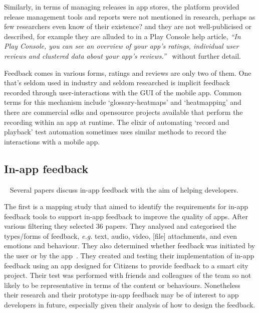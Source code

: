 Similarly, in terms of managing releases in app stores, the platform provided release management tools and reports were not mentioned in research, perhaps as few researchers even know of their existence? and they are not well-publicised or described, for example they are alluded to in a Play Console help article, \emph{``In Play Console, you can see an overview of your app's ratings, individual user reviews and clustered data about your app's reviews.''}~ without further detail.

Feedback comes in various forms, ratings and reviews are only two of them.  One that's seldom used in industry and seldom researched is implicit feedback recorded through user-interactions with the GUI of the mobile app. Common terms for this mechanism include `\glspl{glossary-heatmap}' and `heatmapping' and there are commercial \Glspl{sdk} and opensource projects available that perform the recording within an app at runtime. The elixir of automating `record and playback' test automation sometimes uses similar methods to record the interactions with a mobile app. 

\subsection{In-app feedback}~\label{rw-in-app-feedback-topic}
Several papers discuss in-app feedback with the aim of helping developers. 

The first is a mapping study that aimed to identify the requirements for in-app feedback tools to support in-app feedback to improve the quality of apps. After various filtering they selected 36 papers. They analysed and categorised the types/forms of feedback, \emph{e.g.} text, audio, video, [file] attachments, and even emotions and behaviour. They also determined whether feedback was initiated by the user or by the app~. 
They created and testing their implementation of in-app feedback using an app designed for Citizens to provide feedback to a smart city project. Their test was performed with friends and colleagues of the team so not likely to be representative in terms of the content or behaviours. Nonetheless their research and their prototype in-app feedback may be of interest to app developers in future, especially given their analysis of how to design the feedback. 


